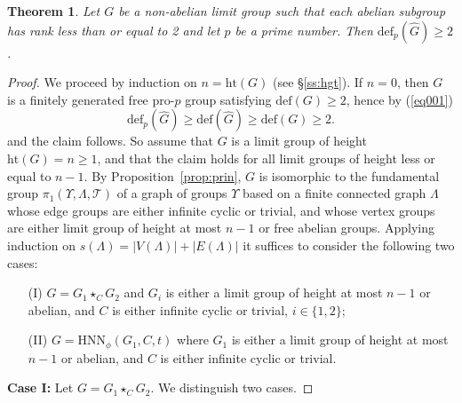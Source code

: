 \documentclass[10pt]{amsart}
\theoremstyle{plain}
\newtheorem{thm}[prop]{Theorem}
\theoremstyle{definition}
\theoremstyle{remark}
\numberwithin{prop}{section}
\numberwithin{example}{section}
\numberwithin{equation}{section}
\newcommand{\de}{\mathrm{def}}
\newcommand{\HNN}{\mathrm{HNN}}
\newcommand{\het}{\mathrm{ht}}
\newcommand{\caT}{\mathcal{T}}
\begin{document}
\begin{thm}\label{thmD}
	Let  $G$ be a non-abelian limit group   such that each abelian subgroup has  rank less than or equal to 2 and let $p$ be a prime number. Then  $\de_p(\widehat{G})\geq 2$.
\end{thm}
\begin{proof}
		We proceed by induction on $n=\het(G)$ (see \S\ref{ss:hgt}).
		If $n=0$, then $G$ is a finitely generated free pro-$p$ group satisfying $\de(G)\geq 2$, hence  by (\ref{eq001})
		\begin{equation}
		\label{eq:mt1}
		\de_p(\widehat{G})\geq \de(\widehat{G})\geq \de(G)\geq 2. 
		\end{equation} 
		and  the claim follows. 
		So assume that $G$ is a limit group of height $\het(G)=n\geq 1$, and that the claim holds
		for all limit groups of height less or equal to $n-1$. By  Proposition~\ref{prop:prin},
		$G$ is isomorphic to the fundamental group $\pi_1(\Upsilon,\Lambda,\caT)$
		of a graph of groups $\Upsilon$ based on a finite connected graph $\Lambda$ whose edge groups are either infinite cyclic or trivial, and whose vertex groups are either limit group of height at most $n-1$ or free abelian groups. 
		Applying induction on $s(\Lambda)=|V(\Lambda)|+|E(\Lambda)|$ it suffices to consider
		the following two cases:
		
		\begin{itemize}
			\item[(I)] $G=G_1 \star_{C} G_2$ and $G_i$ is either a limit group of height
			at most $n-1$ or abelian, and $C$ is either infinite cyclic or trivial, $i\in\{1,2\}$;
			\item[(II)] $G=\HNN_\phi(G_1,C,t)$ where $G_1$ is either a limit group of height
			at most $n-1$ or abelian, and $C$ is either infinite cyclic or trivial.
		\end{itemize}
		
		
		\noindent
		{\bf Case I:} Let  $G=G_1\star_CG_2$. We distinguish two cases. 
		

\end{proof}
\end{document}
